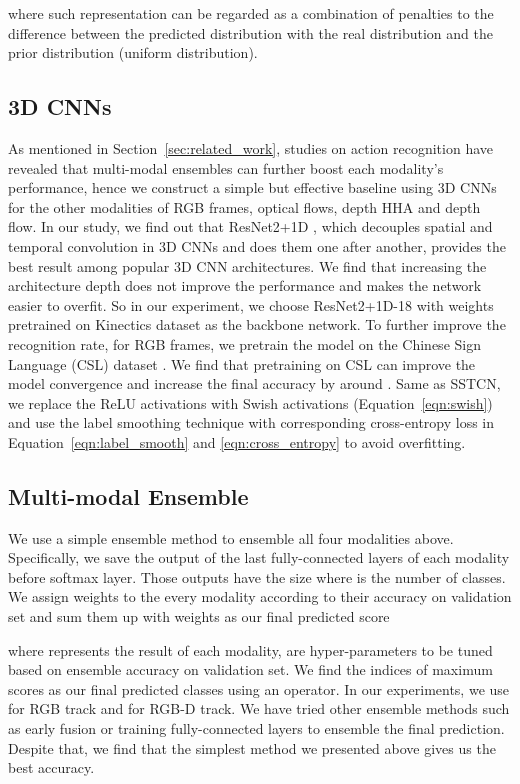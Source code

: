 \documentclass[final]{cvpr}
\begin{document}
where such representation can be regarded as a combination of penalties to the difference between the predicted distribution with the real distribution and the prior distribution (uniform distribution). 



\subsection{3D CNNs}
As mentioned in Section~\ref{sec:related_work}, studies on action recognition have revealed that multi-modal ensembles can further boost each modality's performance, hence we construct a simple but effective baseline using 3D CNNs for the other modalities of RGB frames, optical flows, depth HHA and depth flow. 
In our study, we find out that ResNet2+1D \cite{tran2018closer}, which decouples spatial and temporal convolution in 3D CNNs and does them one after another, provides the best result among popular 3D CNN architectures. We find that increasing the architecture depth does not improve the performance and makes the network easier to overfit. So in our experiment, we choose ResNet2+1D-18 with weights pretrained on Kinectics dataset \cite{carreira2018short} as the backbone network. To further improve the recognition rate, for RGB frames, we pretrain the model on the Chinese Sign Language (CSL) dataset \cite{zhang2016chinese}. We find that pretraining on CSL can improve the model convergence and increase the final accuracy by around . Same as SSTCN, we replace the ReLU activations with Swish activations (Equation~\ref{eqn:swish}) and use the label smoothing technique with corresponding cross-entropy loss in Equation~\ref{eqn:label_smooth} and \ref{eqn:cross_entropy} to avoid overfitting. 


\subsection{Multi-modal Ensemble}
\label{sec:ensemble}
We use a simple ensemble method to ensemble all four modalities above. Specifically, we save the output of the last fully-connected layers of each modality before softmax layer. Those outputs have the size  where  is the number of classes. We assign weights to the every modality according to their accuracy on validation set and sum them up with weights as our final predicted score


where  represents the result of each modality,  are hyper-parameters to be tuned based on ensemble accuracy on validation set. We find the indices of maximum scores as our final predicted classes using an  operator. In our experiments, we use  for RGB track and  for RGB-D track. We have tried other ensemble methods such as early fusion or training fully-connected layers to ensemble the final prediction. Despite that, we find that the simplest method we presented above gives us the best accuracy. 
\end{document}
